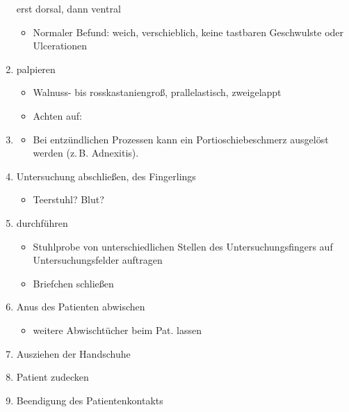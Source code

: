 \begin{WidePar}
\begin{multicols}{2}
\begin{enumerate}
  erst dorsal, dann ventral
  \begin{itemize}
    \item Normaler Befund: weich, verschieblich, keine tastbaren
    Geschwulste oder Ulcerationen
  \end{itemize}
  \item {} palpieren
  \begin{itemize}
    \item {Walnuss- bis rosskastaniengroß, prallelastisch,
    zweigelappt}
    \item {Achten auf:}
  \end{itemize}
  \item {}
  \begin{itemize}
    \item {Bei entzündlichen Prozessen kann ein Portioschiebeschmerz ausgelöst
    werden (z.\,B. Adnexitis).}
  \end{itemize}
  \item Untersuchung abschließen,  des
  Fingerlings
  \begin{itemize}
    \item {Teerstuhl? Blut?}
  \end{itemize}
  \item {} durchführen
  \begin{itemize}
    \item {Stuhlprobe von unterschiedlichen Stellen des Untersuchungsfingers auf
    Untersuchungsfelder auftragen}
    \item Briefchen schließen
  \end{itemize}
  \item Anus des Patienten abwischen
  \begin{itemize}
    \item weitere Abwischtücher beim Pat. lassen
  \end{itemize}
  \item Ausziehen der Handschuhe
  \item Patient zudecken
  \item Beendigung des Patientenkontakts

\end{enumerate}
\end{multicols}
\end{WidePar}

